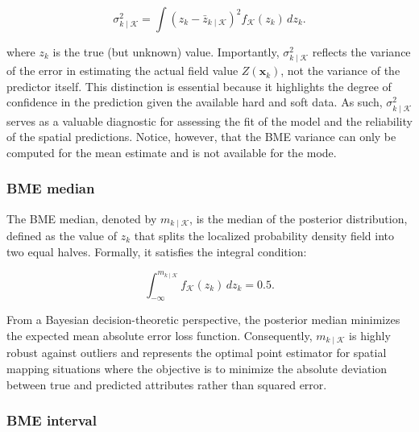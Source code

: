 \vspace{-1em}

\begin{equation}
\sigma^2_{k \mid \mathcal{K}} = \int \left(z_k - \bar{z}_{k \mid \mathcal{K}} \right)^2 f_{\mathcal{K}}(z_k) \, dz_k
\label{eq:post-var}.
\end{equation}

where \(z_k\) is the true (but unknown) value. Importantly, \(\sigma^2_{k \mid \mathcal{K}}\) reflects the variance of the error in estimating the actual field value \(Z(\boldsymbol{x}_k)\), not the variance of the predictor itself. This distinction is essential because it highlights the degree of confidence in the prediction given the available hard and soft data. As such, \(\sigma^2_{k \mid \mathcal{K}}\) serves as a valuable diagnostic for assessing the fit of the model and the reliability of the spatial predictions. Notice, however, that the BME variance can only be computed for the mean estimate and is not available for the mode.

\subsubsection{BME median}\label{bme-median}

The BME median, denoted by \(m_{k \mid \mathcal{K}}\), is the median of the posterior distribution, defined as the value of \(z_k\) that splits the localized probability density field into two equal halves. Formally, it satisfies the integral condition:

\vspace{-1em}

\begin{equation}
\int_{-\infty}^{m_{k \mid \mathcal{K}}} f_{\mathcal{K}}(z_k) \, d z_k = 0.5
\label{eq:post-median}.
\end{equation}

From a Bayesian decision-theoretic perspective, the posterior median minimizes the expected mean absolute error loss function. Consequently, \(m_{k \mid \mathcal{K}}\) is highly robust against outliers and represents the optimal point estimator for spatial mapping situations where the objective is to minimize the absolute deviation between true and predicted attributes rather than squared error.

\subsubsection{BME interval}\label{bme-interval}

